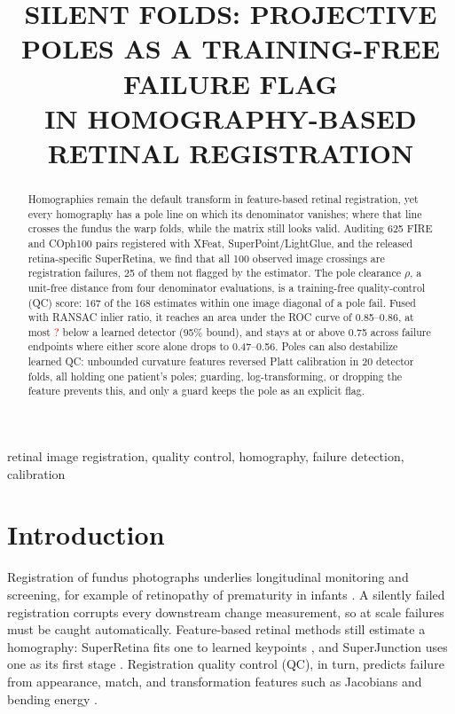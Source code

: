 \documentclass{article}
\title{SILENT FOLDS: PROJECTIVE POLES AS A TRAINING-FREE FAILURE FLAG\\
IN HOMOGRAPHY-BASED RETINAL REGISTRATION}
\newcommand{\pend}[1]{\textcolor{red}{#1}\typeout{PENDING VALUE: #1}}
\providecommand{\numFusedDetMargin}{\pend{?}}
\begin{document}
\ninept
\maketitle

\begin{abstract}
Homographies remain the default transform in feature-based retinal
registration, yet every homography has a pole line on which its denominator
vanishes; where that line crosses the fundus the warp folds, while the matrix
still looks valid. Auditing 625 FIRE and COph100 pairs registered with XFeat,
SuperPoint/LightGlue, and the released retina-specific SuperRetina, we find
that all 100 observed image crossings are registration failures, 25 of them
not flagged by the estimator. The pole clearance $\rho$, a unit-free distance
from four denominator evaluations, is a training-free quality-control (QC)
score: 167 of the 168 estimates within one image diagonal of a pole fail.
Fused with RANSAC inlier ratio, it reaches an area under the ROC curve of
0.85--0.86, at most \numFusedDetMargin{} below a learned detector (95\% bound),
and stays at or above 0.75 across failure endpoints where either score alone
drops to 0.47--0.56. Poles can also destabilize learned QC: unbounded
curvature features reversed Platt calibration in 20 detector folds, all
holding one patient's poles; guarding, log-transforming, or dropping the
feature prevents this, and only a guard keeps the pole as an explicit flag.
\end{abstract}

\begin{keywords}
retinal image registration, quality control, homography, failure detection, calibration
\end{keywords}

\section{Introduction}
\label{sec:intro}

Registration of fundus photographs underlies longitudinal monitoring and
screening, for example of retinopathy of prematurity in infants
\cite{coph,ridirp}. A silently failed registration corrupts every downstream
change measurement, so at scale failures must be caught automatically.
Feature-based retinal methods still estimate a homography: SuperRetina fits
one to learned keypoints \cite{superretina}, and SuperJunction uses one as its
first stage \cite{superjunction}. Registration quality control (QC), in turn, predicts failure
from appearance, match, and transformation features such as Jacobians and
bending energy \cite{bierbrier,sokooti,octfundusreg}.
\end{document}
